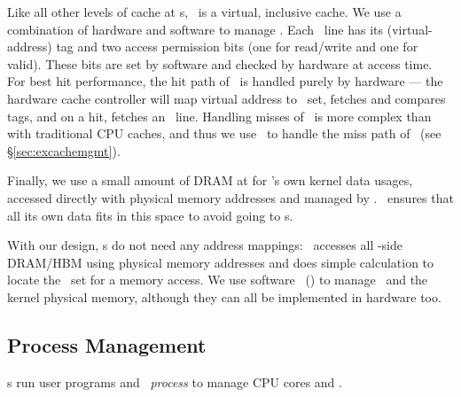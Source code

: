 \documentclass[10pt,times,twocolumn]{z2-article}
\begin{document}
{{{{{{{Like all other levels of cache at \pcomponent{}s, \excache\ is a virtual, inclusive cache.
We use a combination of hardware and software to manage \excache.
Each \excache\ line has its (virtual-address) tag and two access permission bits (one for read/write and one for valid).
These bits are set by software and checked by hardware at access time.
For best hit performance, the hit path of \excache\ is handled purely by hardware
--- the hardware cache controller will map virtual address to \excache\ set, 
fetches and compares tags, and on a hit, fetches an \excache\ line.
Handling misses of \excache\ is more complex than with traditional CPU caches, 
and thus we use \lego\ to handle the miss path of \excache\ (see \S\ref{sec:excachemgmt}).

Finally, we use a small amount of DRAM at \pcomponent{} for \lego's own kernel data usages,
accessed directly with physical memory addresses and managed by \lego. 
\lego\ ensures that all its own data fits in this space to avoid going to \mcomponent{}s.

With our design, \pcomponent{}s do not need any address mappings:
\lego\ accesses all \pcomponent{}-side DRAM/HBM using physical memory addresses
and does simple calculation to locate the \excache\ set for a memory access.
We use software~\cite{softvm-HPCA97,Tsai-ISCA17} (\lego) to manage \excache\ and the kernel physical memory,
although they can all be implemented in hardware too.

\subsection{Process Management}
\pcomponent{}s run user programs and \lego\ {\em process \microos{}}
to manage CPU cores and \excache. 

}}}}}}}
\end{document}
